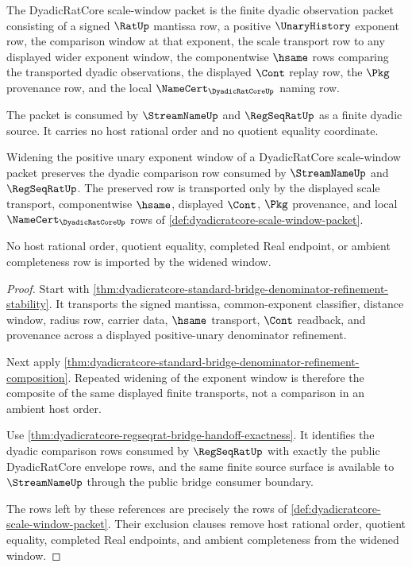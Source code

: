 \begin{definition}
\label{def:dyadicratcore-scale-window-packet}
The DyadicRatCore scale-window packet is the finite dyadic observation packet consisting of a signed $\RatUp$ mantissa row, a positive $\UnaryHistory$ exponent row, the comparison window at that exponent, the scale transport row to any displayed wider exponent window, the componentwise $\hsame$ rows comparing the transported dyadic observations, the displayed $\Cont$ replay row, the $\Pkg$ provenance row, and the local $\NameCert_{\DyadicRatCoreUp}$ naming row.

The packet is consumed by $\StreamNameUp$ and $\RegSeqRatUp$ as a finite dyadic source. It carries no host rational order and no quotient equality coordinate.
\end{definition}

\begin{theorem}
\label{thm:dyadicratcore-scale-window-monotonicity}
Widening the positive unary exponent window of a DyadicRatCore scale-window packet preserves the dyadic comparison row consumed by $\StreamNameUp$ and $\RegSeqRatUp$. The preserved row is transported only by the displayed scale transport, componentwise $\hsame$, displayed $\Cont$, $\Pkg$ provenance, and local $\NameCert_{\DyadicRatCoreUp}$ rows of \autoref{def:dyadicratcore-scale-window-packet}.

No host rational order, quotient equality, completed Real endpoint, or ambient completeness row is imported by the widened window.
\end{theorem}
\begin{proof}
Start with \autoref{thm:dyadicratcore-standard-bridge-denominator-refinement-stability}. It transports the signed mantissa, common-exponent classifier, distance window, radius row, carrier data, $\hsame$ transport, $\Cont$ readback, and provenance across a displayed positive-unary denominator refinement.

Next apply \autoref{thm:dyadicratcore-standard-bridge-denominator-refinement-composition}. Repeated widening of the exponent window is therefore the composite of the same displayed finite transports, not a comparison in an ambient host order.

Use \autoref{thm:dyadicratcore-regseqrat-bridge-handoff-exactness}. It identifies the dyadic comparison rows consumed by $\RegSeqRatUp$ with exactly the public DyadicRatCore envelope rows, and the same finite source surface is available to $\StreamNameUp$ through the public bridge consumer boundary.

The rows left by these references are precisely the rows of \autoref{def:dyadicratcore-scale-window-packet}. Their exclusion clauses remove host rational order, quotient equality, completed Real endpoints, and ambient completeness from the widened window.
\end{proof}

